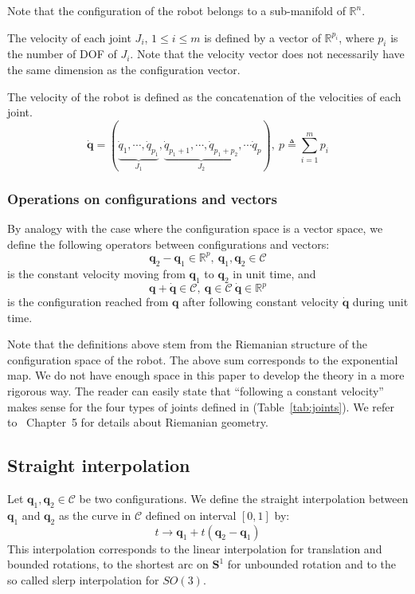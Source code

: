 \documentclass{tADR2e}
\newcommand\real{\mathbb{R}}
\newcommand\CS{\mathcal{C}}
\newcommand\Sone{\mathbf{S}^1}
\newcommand\conf{\mathbf{q}}
\begin{document}
Note that the configuration of the robot belongs to a sub-manifold of $\real^n$.

The velocity of each joint $J_i$, $1\leq i \leq m$ is defined by a vector of $
\real^{p_i}$, where $p_i$ is the number of DOF of $J_i$. Note that 
the velocity vector does not necessarily have the same dimension as the 
configuration vector.

The velocity of the robot is defined as the concatenation of the velocities of 
each joint.
$$\dot{\conf} = (\underbrace{\dot{q}_{1},\cdots,\dot{q}_{p_1}}_{J_1},
\underbrace{\dot{q}_{p_1+1},\cdots,\dot{q}_{p_1+p_2}}_{J_2},\cdots \dot{q}_p),\ p
\triangleq\sum_{i=1}^m p_i$$

\subsubsection{Operations on configurations and vectors}%
By analogy with the case 
where the configuration space is a vector space, we define the following 
operators between configurations and vectors:
$$
\conf_2 - \conf_1 \in \real^p, \ \conf_1, \conf_2\in\CS
$$
is the constant velocity moving from $\conf_1$ to $\conf_2$ in unit time, and
$$
\conf + \dot{\conf}\in\CS, \ \conf\in\CS \ \dot{\conf}\in\real^p
$$
is the configuration reached from $\conf$ after following constant velocity $
\dot{\conf}$ during unit time.

Note that the definitions above stem from the Riemanian structure of the 
configuration space of the robot. The above sum corresponds to the exponential 
map. We do not have enough space in this paper to develop the theory in a more 
rigorous way. The reader can easily state that ``following a 
constant velocity'' makes sense for the four types of joints defined in 
(Table~\ref{tab:joints}). We refer to~\cite{riemanian-optim2008} Chapter~5 for 
details about Riemanian geometry.

\subsection {Straight interpolation}

Let $\conf_1, \conf_2\in\CS$ be two configurations. We define the straight 
interpolation between $\conf_1$ and $\conf_2$ as the curve in $\CS$ defined on 
interval $[0,1]$ by:
$$
t \rightarrow \conf_1 + t (\conf_2 - \conf_1)
$$
This interpolation corresponds to the linear interpolation for translation and 
bounded rotations, to the shortest arc on $\Sone$ for unbounded rotation and to 
the so called slerp interpolation for $SO(3)$.
\end{document}
